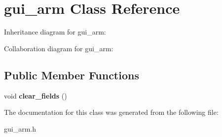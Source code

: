 \hypertarget{classgui__arm}{}\section{gui\+\_\+arm Class Reference}
\label{classgui__arm}


Inheritance diagram for gui\+\_\+arm\+:


Collaboration diagram for gui\+\_\+arm\+:
\subsection*{Public Member Functions}
\begin{DoxyCompactItemize}
\item 
void {\bfseries clear\+\_\+fields} ()\hypertarget{classgui__arm_aede8c24a2cf91730d6466e837bd9ece1}{}\label{classgui__arm_aede8c24a2cf91730d6466e837bd9ece1}

\end{DoxyCompactItemize}


The documentation for this class was generated from the following file\+:\begin{DoxyCompactItemize}
\item 
gui\+\_\+arm.\+h\end{DoxyCompactItemize}
